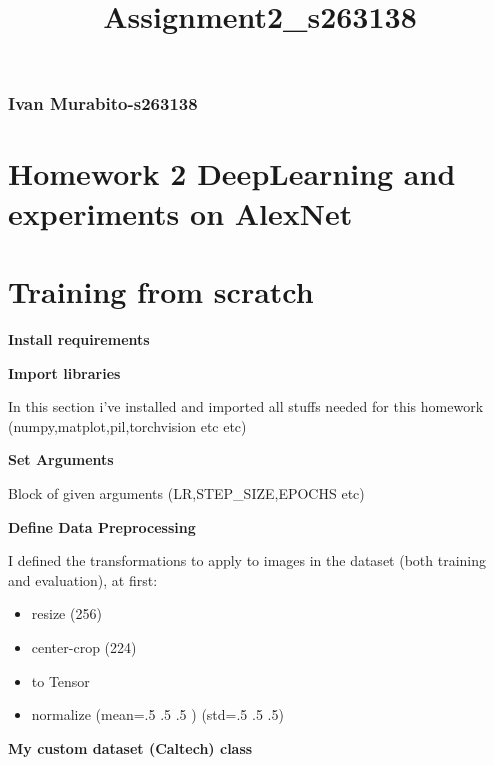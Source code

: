 \documentclass[11pt]{article}
\title{Assignment2\_s263138}
\providecommand{\tightlist}{%
      \setlength{\itemsep}{0pt}\setlength{\parskip}{0pt}}
\begin{document}
    
    
    \maketitle
    
    

    
    \hypertarget{ivan-murabito-s263138}{%
\subsubsection{\texorpdfstring{\textbf{Ivan
Murabito-s263138}}{Ivan Murabito-s263138}}\label{ivan-murabito-s263138}}

\hypertarget{homework-2-deeplearning-and-experiments-on-alexnet}{%
\section{Homework 2 DeepLearning and experiments on
AlexNet}\label{homework-2-deeplearning-and-experiments-on-alexnet}}

    \hypertarget{training-from-scratch}{%
\section{Training from scratch}\label{training-from-scratch}}

    \textbf{Install requirements}

    \textbf{Import libraries}

    In this section i've installed and imported all stuffs needed for this
homework (numpy,matplot,pil,torchvision etc etc)

    \textbf{Set Arguments}

    Block of given arguments (LR,STEP\_SIZE,EPOCHS etc)

    \textbf{Define Data Preprocessing}

    I defined the transformations to apply to images in the dataset (both
training and evaluation), at first:

\begin{itemize}
\tightlist
\item
  resize (256)
\item
  center-crop (224)
\item
  to Tensor
\item
  normalize (mean=.5 .5 .5 ) (std=.5 .5 .5)
\end{itemize}

    \textbf{My custom dataset (Caltech) class}
\end{document}
